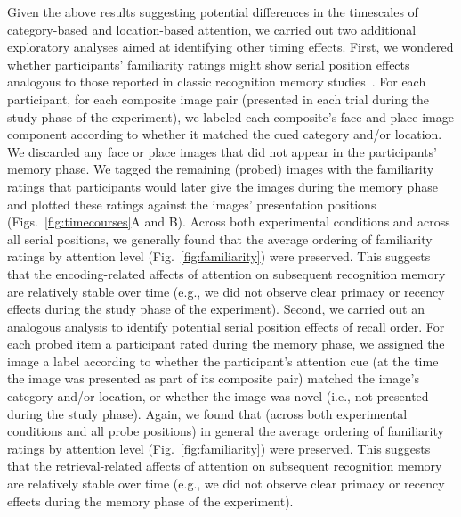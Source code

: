 \documentclass[english]{article}
\begin{document}
Given the above results suggesting potential differences in the timescales of
category-based and location-based attention, we carried out two additional
exploratory analyses aimed at identifying other timing effects. First, we
wondered whether participants' familiarity ratings might show serial position
effects analogous to those reported in classic recognition memory
studies~\citep[e.g.,][]{Neat93b, McElDosh89, WickNorm66}. For each participant,
for each composite image pair (presented in each trial during the study phase
of the experiment), we labeled each composite's face and place image component
according to whether it matched the cued category and/or location. We discarded
any face or place images that did not appear in the participants' memory phase.
We tagged the remaining (probed) images with the familiarity ratings that
participants would later give the images during the memory phase and plotted
these ratings against the images' presentation positions
(Figs.~\ref{fig:timecourses}A and B). Across both experimental conditions and
across all serial positions, we generally found that the average ordering of
familiarity ratings by attention level (Fig.~\ref{fig:familiarity}) were
preserved. This suggests that the encoding-related affects of attention on
subsequent recognition memory are relatively stable over time (e.g., we did not
observe clear primacy or recency effects during the study phase of the
experiment). Second, we carried out an analogous analysis to identify potential
serial position effects of recall order. For each probed item a participant
rated during the memory phase, we assigned the image a label according to
whether the participant's attention cue (at the time the image was presented as
part of its composite pair) matched the image's category and/or location, or
whether the image was novel (i.e., not presented during the study phase).
Again, we found that (across both experimental conditions and all probe
positions) in general the average ordering of familiarity ratings by attention
level (Fig.~\ref{fig:familiarity}) were preserved. This suggests that the
retrieval-related affects of attention on subsequent recognition memory are
relatively stable over time (e.g., we did not observe clear primacy or recency
effects during the memory phase of the experiment).
\end{document}
